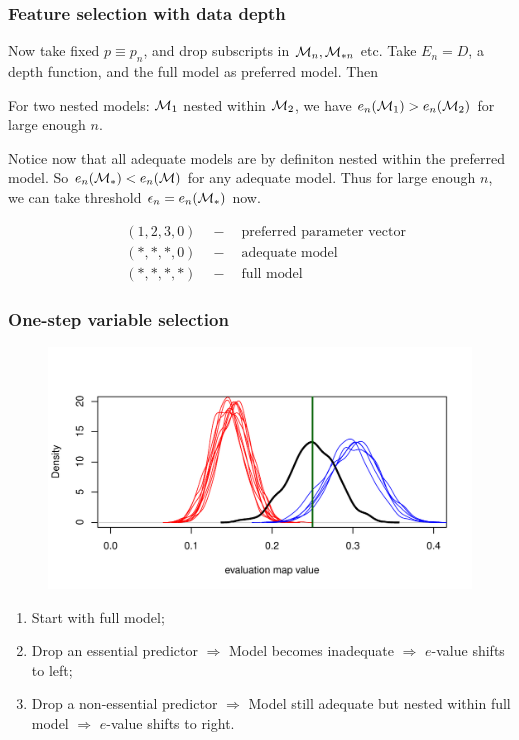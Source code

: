 \documentclass[handout,10pt]{beamer}
\begin{document}
\begin{frame}
\frametitle{Feature selection with data depth}

Now take fixed $p \equiv p_n$, and drop subscripts in ${\cal{M}}_n, {\cal{M}}_{* n}$ etc. Take $E_n = D$, a depth function, and the full model as preferred model. Then

\begin{theorem}
For two nested models: ${\cal{M}}_{1}$ nested within ${\cal{M}}_{2}$, we have $e_n ({\cal{M}}_{1}) > e_n ( {\cal{M}}_{2})$ for large enough $n$.
\end{theorem}

\vspace{1em}
Notice now that all adequate models are by definiton nested within the preferred model. So $e_n ({\cal{M}}_*) < e_n ({\cal{M}})$ for any adequate model. Thus for large enough $n$, we can take threshold $\epsilon_n = e_n ({\cal{M}}_*)$ now.

%
\begin{align*}
& (1, 2, 3, 0) \quad - \quad \text{preferred parameter vector}\\
& (*, *, *, 0) \quad - \quad \text{adequate model}\\
& (*, *, *, *) \quad - \quad \text{full model}
\end{align*}

\end{frame}


\begin{frame}
\frametitle{One-step variable selection}
\begin{figure}
\centering
\includegraphics[width=.8\textwidth]{fullplot3}
\end{figure}

\begin{enumerate}
\item Start with full model;

\item Drop an essential predictor $\Rightarrow$ Model becomes inadequate $\Rightarrow$ $e$-value shifts to left;

\item Drop a non-essential predictor $\Rightarrow$ Model still adequate but nested within full model $\Rightarrow$ $e$-value shifts to right.
\end{enumerate}
\end{frame}
\end{document}
